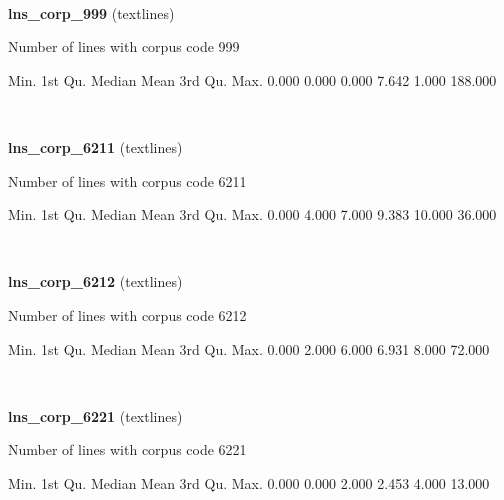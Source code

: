 \documentclass[]{article}
\newenvironment{Shaded}{\begin{snugshade}}{\end{snugshade}}
\newcommand{\FloatTok}[1]{\textcolor[rgb]{0.00,0.00,0.81}{{#1}}}
\newcommand{\NormalTok}[1]{{#1}}
\begin{document}
~

\vspace{1em}

\textbf{lns\_corp\_999} (textlines)

Number of lines with corpus code 999

\begin{Shaded}
\begin{Highlighting}[]
   \NormalTok{Min. 1st Qu.  Median    Mean 3rd Qu.    Max. }
  \FloatTok{0.000}   \FloatTok{0.000}   \FloatTok{0.000}   \FloatTok{7.642}   \FloatTok{1.000} \FloatTok{188.000} 
\end{Highlighting}
\end{Shaded}

~

\vspace{1em}

\textbf{lns\_corp\_6211} (textlines)

Number of lines with corpus code 6211

\begin{Shaded}
\begin{Highlighting}[]
   \NormalTok{Min. 1st Qu.  Median    Mean 3rd Qu.    Max. }
  \FloatTok{0.000}   \FloatTok{4.000}   \FloatTok{7.000}   \FloatTok{9.383}  \FloatTok{10.000}  \FloatTok{36.000} 
\end{Highlighting}
\end{Shaded}

~

\vspace{1em}

\textbf{lns\_corp\_6212} (textlines)

Number of lines with corpus code 6212

\begin{Shaded}
\begin{Highlighting}[]
   \NormalTok{Min. 1st Qu.  Median    Mean 3rd Qu.    Max. }
  \FloatTok{0.000}   \FloatTok{2.000}   \FloatTok{6.000}   \FloatTok{6.931}   \FloatTok{8.000}  \FloatTok{72.000} 
\end{Highlighting}
\end{Shaded}

~

\vspace{1em}

\textbf{lns\_corp\_6221} (textlines)

Number of lines with corpus code 6221

\begin{Shaded}
\begin{Highlighting}[]
   \NormalTok{Min. 1st Qu.  Median    Mean 3rd Qu.    Max. }
  \FloatTok{0.000}   \FloatTok{0.000}   \FloatTok{2.000}   \FloatTok{2.453}   \FloatTok{4.000}  \FloatTok{13.000} 
\end{Highlighting}
\end{Shaded}
\end{document}
